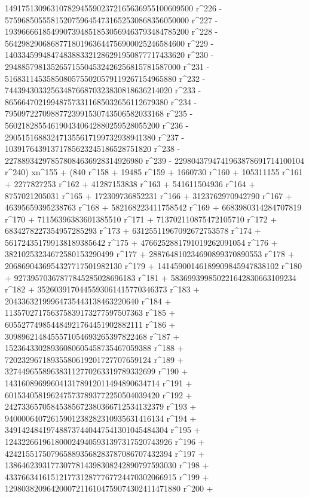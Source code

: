        149175130963107829455902372165636955100609500 r^226 - 
       57596850555815207596454731652530868356050000 r^227 - 
       19396666185499073948518530569463793484785200 r^228 - 
       5642982906868771801963644756900025246584600 r^229 - 
       1403345994847483883321286291950877717433620 r^230 - 
       294885798135265715504532426256815781587000 r^231 - 
       51683114535850805755020579119267154965880 r^232 - 
       7443943033256348766870323830818636214020 r^233 - 
       865664702199487573311685032656112679380 r^234 - 
       79509722709887723991530743506582033168 r^235 - 
       5602182855461904340642880259528055200 r^236 - 
       290515168832471355617199732938941380 r^237 - 
       10391764391371785623245186528751820 r^238 - 
       227889342978578084636928314926980 r^239 - 
       2298043794741963878691714100104 r^240) xn^155 + (840 r^158 + 
       19485 r^159 + 1660730 r^160 + 105311155 r^161 + 
       2277827253 r^162 + 41287153838 r^163 + 541611504936 r^164 + 
       8757021205031 r^165 + 172309736852231 r^166 + 
       3123762970942790 r^167 + 46395659395238763 r^168 + 
       582168223411758542 r^169 + 6683980314284707819 r^170 + 
       71156396383601385510 r^171 + 713702110875472105710 r^172 + 
       6834278227354957285293 r^173 + 63125511967092672753578 r^174 + 
       561724351799138189385642 r^175 + 
       4766252881791019262091054 r^176 + 
       38210253234672580153290499 r^177 + 
       288764810234690899370890553 r^178 + 
       2068690436954327717501982130 r^179 + 
       14145900146189909845947838102 r^180 + 
       92739570367877845285028696183 r^181 + 
       583699399850221642830663109234 r^182 + 
       3526039170445593061415770346373 r^183 + 
       20433632199964735443138463220640 r^184 + 
       113570271756375839173277597507363 r^185 + 
       605527749854484921764451902882111 r^186 + 
       3098962148455571054693265397822468 r^187 + 
       15236433028936080605458735467059388 r^188 + 
       72023296718935580619201727707659124 r^189 + 
       327449655896383112770263319789332699 r^190 + 
       1431608969960413178912011494890634714 r^191 + 
       6015340581962475737893772250504039420 r^192 + 
       24273365705845385672380366712534132379 r^193 + 
       94000064072615901238282310935631416134 r^194 + 
       349142484197488737440447541301045484304 r^195 + 
       1243226619618000249405931397317520743926 r^196 + 
       4242155175079658893568283787086707432394 r^197 + 
       13864623931773077814398308242890797593030 r^198 + 
       43376634161512177312877767724470302066915 r^199 + 
       129803820964200072116104759074302411471880 r^200 + 
